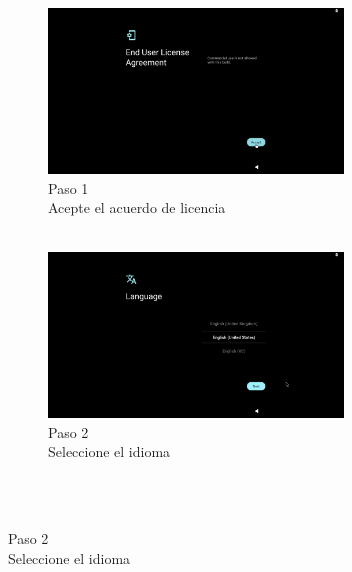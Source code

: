 \documentclass[letterpaper,10.5pt]{article}
\begin{document}
\begin{figure}[H]
	\centering%
	\begin{subfigure}[b]{0.48\linewidth}
		\centering
		\includegraphics[width=0.9\linewidth,height=44mm,keepaspectratio]{img/p02-03-wizard-1.png} %
		\caption{Paso 1\\Acepte el acuerdo de licencia\\~}
		\label{fig:setup-wizard-step-1} %
	\end{subfigure}%
	\begin{subfigure}[b]{0.48\linewidth}
		\centering
		\includegraphics[width=0.9\linewidth,height=44mm,keepaspectratio]{img/p02-03-wizard-2.png} %
		\caption{Paso 2\\Seleccione el idioma\\~}
		\label{fig:setup-wizard-step-2} %
	\end{subfigure}\\
\end{figure}%
\end{document}
